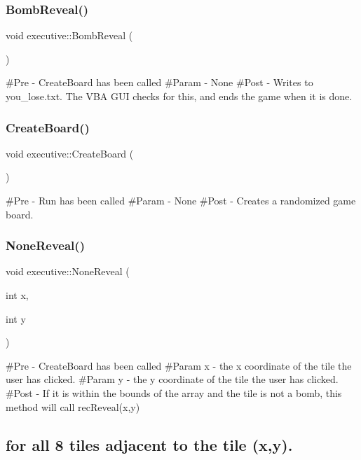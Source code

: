 \subsubsection{\texorpdfstring{BombReveal()}{BombReveal()}}
{\footnotesize\ttfamily void executive\+::\+Bomb\+Reveal (\begin{DoxyParamCaption}{ }\end{DoxyParamCaption})}

\#\+Pre -\/ Create\+Board has been called \#\+Param -\/ None \#\+Post -\/ Writes to you\+\_\+lose.\+txt. The V\+BA G\+UI checks for this, and ends the game when it is done. \mbox{\label{classexecutive_adccfcb025102490e13fd355d9c8bb3e8}} 
\subsubsection{\texorpdfstring{CreateBoard()}{CreateBoard()}}
{\footnotesize\ttfamily void executive\+::\+Create\+Board (\begin{DoxyParamCaption}{ }\end{DoxyParamCaption})}

\#\+Pre -\/ Run has been called \#\+Param -\/ None \#\+Post -\/ Creates a randomized game board. \mbox{\label{classexecutive_aff9907584bb8cf4840af71a283182b50}} 
\subsubsection{\texorpdfstring{NoneReveal()}{NoneReveal()}}
{\footnotesize\ttfamily void executive\+::\+None\+Reveal (\begin{DoxyParamCaption}\item[{int}]{x,  }\item[{int}]{y }\end{DoxyParamCaption})}

\#\+Pre -\/ Create\+Board has been called \#\+Param x -\/ the x coordinate of the tile the user has clicked. \#\+Param y -\/ the y coordinate of the tile the user has clicked. \#\+Post -\/ If it is within the bounds of the array and the tile is not a bomb, this method will call rec\+Reveal(x,y) \subsection*{for all 8 tiles adjacent to the tile (x,y).}\mbox{\label{classexecutive_a8fecd4b8d669dc584d9e7b4ba43c0eb7}} 
